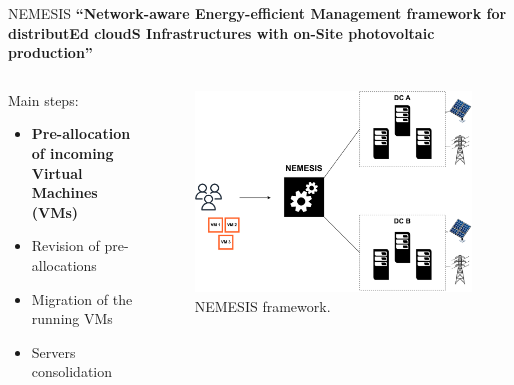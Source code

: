 \documentclass[Ligatures=TeX,table,svgnames,usetotalslideindicator,compress,10pt,aspectratio=169]{beamer}
\begin{document}
\begin{frame}{NEMESIS}
  \textbf {``\alert{N}etwork-aware \alert{E}nergy-efficient
    \alert{M}anagement framework for distribut\alert{E}d
    cloud\alert{S} \alert{I}nfrastructures with on-\alert{S}ite
    photovoltaic production''}  
  \begin{columns}        
    \begin{column}{0.4\textwidth}
Main steps:
\small
\begin{itemize}
    \item \alert{\textbf{Pre-allocation of incoming Virtual Machines (VMs)}}
    \item Revision of pre-allocations
    \item Migration of the running VMs
    \item Servers consolidation
\end{itemize}
\end{column}   

\begin{column}{0.6\textwidth}
      \begin{figure}[!h]
        \centering
        \includegraphics[width=.85\textwidth]{images/nemesis_pre_aloc_1.pdf}
        \caption{NEMESIS framework.}
      \end{figure}
    \end{column}        

\end{columns}
\end{frame}


\addtocounter{framenumber}{-1}
\end{document}

